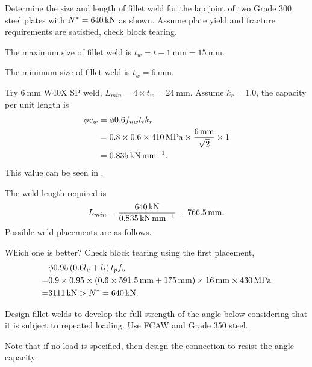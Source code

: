 \begin{exmp} Determine the size and length of fillet weld for the lap joint of two Grade 300 steel plates with $N^*=\SI{640}{\kilo\newton}$ as shown.
Assume plate yield and fracture requirements are satisfied, check block tearing.
\begin{figure}[H]

\end{figure}
\end{exmp}
\begin{solution}
The maximum size of fillet weld is $t_w=t-\SI{1}{\mm}=\SI{15}{\mm}$.

The minimum size of fillet weld is $t_w=\SI{6}{\mm}$.

Try $\SI{6}{\mm}$ W40X SP weld, $L_{min}=4\times{}t_w=\SI{24}{\mm}$.
Assume $k_r=1.0$, the capacity per unit length is
\begin{align*}
\phi{}v_w&=\phi{}0.6f_{uw}t_tk_r\\
&=0.8\times0.6\times\SI{410}{\mega\pascal}\times\dfrac{\SI{6}{\milli\meter}}{\sqrt{2}}\times1\\
&=\SI{0.835}{\kilo\newton\per\milli\meter}.
\end{align*}
This value can be seen in .

The weld length required is
\begin{gather*}
L_{min}=\dfrac{\SI{640}{\kilo\newton}}{\SI{0.835}{\kilo\newton\per\milli\meter}}=\SI{766.5}{\milli\meter}.
\end{gather*}
Possible weld placements are as follows.
\begin{figure}[H]
\centering

\end{figure}
Which one is better?
Check block tearing using the first placement,
\begin{align*}
&\phi0.95\left(0.6l_{v}+l_{t}\right)t_pf_u\\=&0.9\times0.95\times\left(0.6\times\SI{591.5}{\milli\meter}+\SI{175}{\milli\meter}\right)\times\SI{16}{\milli\meter}\times\SI{430}{\mega\pascal}
\\=&\SI{3111}{\kilo\newton}>N^*=\SI{640}{\kilo\newton}.
\end{align*}
\end{solution}
\begin{exmp}
Design fillet welds to develop the full strength of the angle below considering that it is subject to repeated loading.
Use FCAW and Grade 350 steel.

Note that if no load is specified, then design the connection to resist the angle capacity.
\begin{figure}[H]

\end{figure}
\end{exmp}

